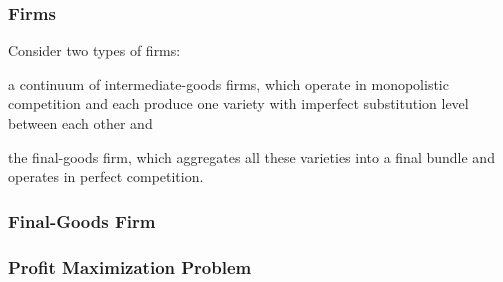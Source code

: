 \documentclass[../thesis.tex]{subfiles}
\begin{document}

\begin{comment}

	Define the regional consumer inflation gross rate:
	\begin{align}
		\pi_{\eta t} &= \frac{Q_{\eta t}}{Q_{\eta, t-1}} \label{eq_v2:consumer-inflation}
	\end{align}

	The relation between the nominal $R_{t}$ and the real $r_{t}$ interest rates is the gross inflation rate $\pi_{t}$, given by the Fisher equation. %
	\begin{align}
		\pi_{t} = \frac{(1 + R_{t})}{(1 + r_{t})}  \label{eq_v2:fisher-equation}
	\end{align}
	
\end{comment}



\subsubsection*{Firms}

Consider two types of firms: 
\begin{enumerate*}[label=(\arabic*)]
	\item a continuum of intermediate-goods firms, which operate in monopolistic competition and each produce one variety with imperfect substitution level between each other and
	\item the final-goods firm, which aggregates all these varieties into a final bundle and operates in perfect competition.
\end{enumerate*}


\subsubsection{Final-Goods Firm}

\subsubsection*{Profit Maximization Problem}
\end{document}
